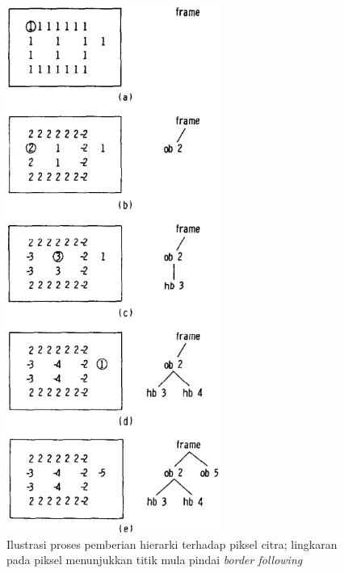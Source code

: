 \begin{figure}[H]
	\centering
	\includegraphics[keepaspectratio, width=7cm]{gambar/BorderFollowingPustaka/pic3.png}
	\caption{Ilustrasi proses pemberian hierarki terhadap piksel citra; 
	lingkaran pada piksel menunjukkan titik mula pindai \textit{border following}}
	\label{gambar:ProsesJalanBorderFollowing}
\end{figure}

